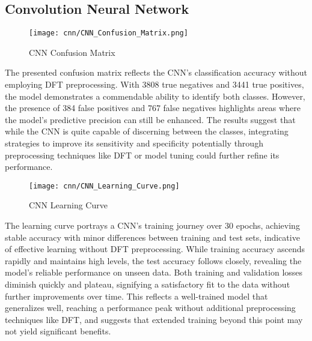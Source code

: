
\subsection{Convolution Neural Network}\label{cnn_visual}

\begin{figure}[H] 
  \centering
  \texttt{[image: cnn/CNN\_Confusion\_Matrix.png]}
  \caption{CNN Confusion Matrix}\label{fig:cnn_confusion_matrix}
\end{figure}

The presented confusion matrix reflects the CNN's classification accuracy without employing DFT preprocessing. With 3808 true negatives and 3441 true positives, the model demonstrates a commendable ability to identify both classes. However, the presence of 384 false positives and 767 false negatives highlights areas where the model's predictive precision can still be enhanced. The results suggest that while the CNN is quite capable of discerning between the classes, integrating strategies to improve its sensitivity and specificity potentially through preprocessing techniques like DFT or model tuning could further refine its performance.


\begin{figure}[H] 
  \centering
  \texttt{[image: cnn/CNN\_Learning\_Curve.png]}
  \caption{CNN Learning Curve}\label{fig:cnn_learning_curve}
\end{figure}

The learning curve portrays a CNN's training journey over 30 epochs, achieving stable accuracy with minor differences between training and test sets, indicative of effective learning without DFT preprocessing. While training accuracy ascends rapidly and maintains high levels, the test accuracy follows closely, revealing the model's reliable performance on unseen data. Both training and validation losses diminish quickly and plateau, signifying a satisfactory fit to the data without further improvements over time. This reflects a well-trained model that generalizes well, reaching a performance peak without additional preprocessing techniques like DFT, and suggests that extended training beyond this point may not yield significant benefits.


